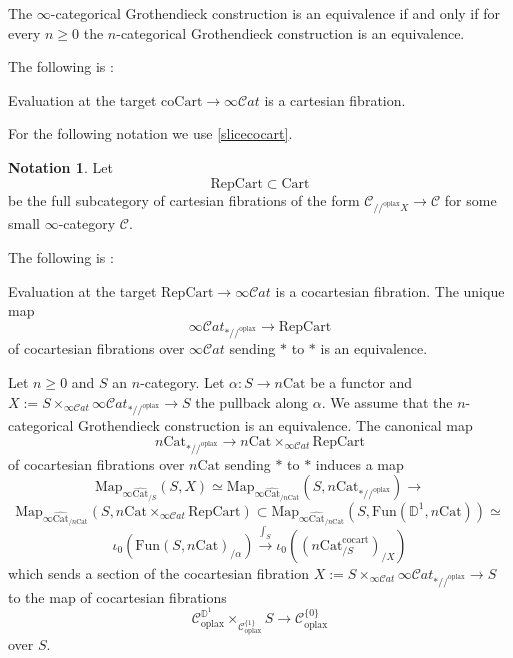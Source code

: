 \documentclass[10pt,oneside]{article}
\numberwithin{equation}{section} %
\numberwithin{figure}{section} %
\theoremstyle{plain}
\theoremstyle{definition}
\newtheorem{notation}[thm]{Notation}
\newcommand{\bD}{{\mathbb D}}
\newcommand{\mC}{{\mathcal C}}
\newcommand{\Cat}{\mathrm{Cat}}
\newcommand{\Rep}{\mathrm{Rep}}
\newcommand{\Fun}{\mathrm{Fun}}
\newcommand{\cocart}{{\mathrm{cocart}}}
\newcommand{\Cart}{{\mathrm{Cart}}}
\newcommand{\oplax}{{\mathrm{oplax}}}
\newcommand{\Map}{{\mathrm{Map}}}
\newcommand{\coCart}{{\mathrm{coCart}}}
\newcommand{\scat}{\mathcal{C}\mathit{at}}
\begin{document}
\begin{corollary}\label{Groind}

The $\infty$-categorical Grothendieck construction is an equivalence if and only if for every $n \geq 0$ the $n$-categorical Grothendieck construction is an equivalence.
   
\end{corollary}

The following is \cite[
Proposition 4.6.1.]{gepner2026fibrations}:

\begin{proposition}

Evaluation at the target $\coCart \to \infty\scat$
is a cartesian fibration.
  
\end{proposition}

For the following notation we use \cref{slicecocart}.
\begin{notation}

Let $$\Rep\Cart \subset \Cart$$ be the full subcategory of cartesian fibrations of the form
$\mC_{//^\oplax X} \to \mC $ for some small $\infty$-category $\mC.$

\end{notation}

The following is \cite[Proposition 4.6.4.]{gepner2026fibrations}:

\begin{proposition}\label{univ2}
Evaluation at the target $\Rep\Cart \to \infty\scat$
is a cocartesian fibration.
The unique map $$ \infty\scat_{*//^\oplax} \to \Rep\Cart $$
of cocartesian fibrations over $ \infty\scat$ sending $* $ to $*$ is an equivalence.

\end{proposition}


\begin{proposition}\label{univ3}
Let $n \geq 0$ and $S$ an $n$-category. Let $\alpha: S \to n\Cat$ be a functor and $X:=S \times_{\infty\scat} \infty\scat_{*//^\oplax} \to S $ the pullback along $\alpha.$
We assume that the $n$-categorical Grothendieck construction is an equivalence.
The canonical map 
$$ n\Cat_{*//^\oplax} \to n \Cat \times_{\infty\scat} \Rep\Cart $$
of cocartesian fibrations over $ n\Cat$ sending $*$ to $*$
induces a map
$$
\Map_{\infty\widehat{\Cat}_{/S}}(S,X) \simeq \Map_{\infty\widehat{\Cat}_{/n\Cat}}(S,n\Cat_{*//^\oplax}) \to $$$$\Map_{\infty\widehat{\Cat}_{/n\Cat}}(S,n \Cat \times_{\infty\scat} \Rep\Cart) \subset \Map_{\infty\widehat{\Cat}_{/n\Cat}}(S,\Fun(\bD^1, n\Cat)) \simeq $$$$\iota_0(\Fun(S,n\Cat)_{/\alpha}) \xrightarrow{\int_S}\iota_0((n\Cat^{\cocart}_{/S})_{/X})$$
which sends a section of the cocartesian fibration $X:=S \times_{\infty\scat} \infty\scat_{*//^\oplax} \to S $ to the map of cocartesian fibrations
$$ \mC^{\bD^1}_\oplax \times_{\mC_\oplax^{\{1\}}} S \to \mC_\oplax^{\{0\}}$$
over $S.$


\end{proposition}
\end{document}
